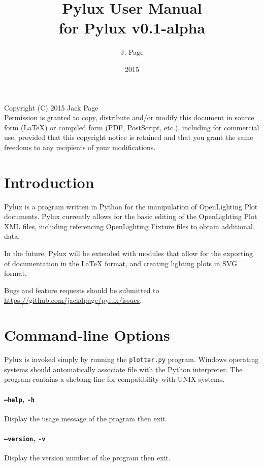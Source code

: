 \documentclass[a4paper]{article}
\begin{document}
\title{Pylux User Manual \\ \large{for Pylux v0.1-alpha}}
\author{J. Page}
\date{2015}
\maketitle
\vspace{1.0pt}
Copyright (C)  2015 Jack Page \\
Permission is granted to copy, distribute and/or modify this document
in source form (LaTeX) or compiled form (PDF, PostScript, etc.), including 
for commercial use, provided that this copyright notice is retained and that 
you grant the same freedoms to any recipients of your modifications.
\tableofcontents
\newpage
\section{Introduction}
Pylux is a program written in Python for the manipulation of OpenLighting Plot
documents. Pylux currently allows for the basic editing of the OpenLighting
Plot XML files, including referencing OpenLighting Fixture files to obtain
additional data.

In the future, Pylux will be extended with modules that allow for the exporting
of documentation in the \LaTeX{} format, and creating lighting plots in SVG 
format.

Bugs and feature requests should be submitted to 
\url{https://github.com/jackdpage/pylux/issues}.

\section{Command-line Options}
Pylux is invoked simply by running the \texttt{plotter.py} program. Windows 
operating systems should automatically associate file with the Python 
interpreter. The program contains a shebang line for compatibility with UNIX
systems. 

\paragraph{\texttt{--help}, \texttt{-h}}
Display the usage message of the program then exit.

\paragraph{\texttt{--version}, \texttt{-v}}
Display the version number of the program then exit.
\end{document}
